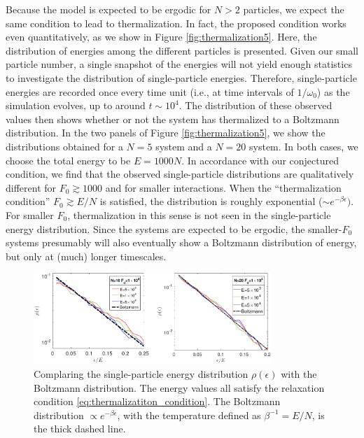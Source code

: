 \documentclass[a4paper, onecolumn]{revtex4-1}
\begin{document}
Because the model is expected to be ergodic for $N>2$ particles, we expect the same condition to
lead to thermalization.  In fact, the proposed condition works even quantitatively, as we show in
Figure \ref{fig:thermalization5}.  Here, the distribution of energies among the different particles
is presented.  Given our small particle number, a single snapshot of the energies will not yield
enough statistics to investigate the distribution of single-particle energies.  Therefore,
single-particle energies are recorded once every time unit (i.e., at time intervals of $1/\omega_0$)
as the simulation evolves, up to around $t\sim10^4$.  The distribution of these observed values then
shows whether or not the system has thermalized to a Boltzmann distribution.  In the two panels of
Figure \ref{fig:thermalization5}, we show the distributions obtained for a $N=5$ system and a $N=20$
system.  In both cases, we choose the total energy to be $E=1000N$.  In accordance with our
conjectured condition, we find that the observed single-particle distributions are qualitatively
different for $F_0\gtrsim1000$ and for smaller interactions.  When the ``thermalization condition''
$F_0\gtrsim E/N$ is satisfied, the distribution is roughly exponential ($\sim e^{-\beta\epsilon})$.
For smaller $F_0$, thermalization in this sense is not seen in the single-particle energy
distribution.  Since the systems are expected to be ergodic, the smaller-$F_0$ systems presumably
will also eventually show a Boltzmann distribution of energy, but only at (much) longer timescales.



\begin{figure}[tb]
\includegraphics[width=0.8\textwidth]{ZhiyuPictures/Boltzmann_log_2panels_01-crop.pdf}
%
\caption{\label{fig:thermalization9} Complaring the single-particle energy distribution
  $\rho(\epsilon)$ with the Boltzmann distribution.  The energy values all satisfy the relaxation
  condition \eqref{eq:thermalizatiton_condition}.  The Boltzmann distribution $\propto
  e^{-\beta\epsilon}$, with the temperature defined as $\beta^{-1}= E/N$, is the thick dashed line.}
\end{figure}
\end{document}
